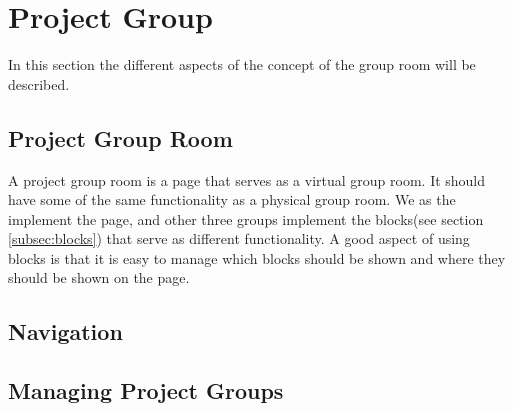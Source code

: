\section{Project Group}
In this section the different aspects of the concept of the group room will be described.
\subsection{Project Group Room}
A project group room is a page that serves as a virtual group room. 
It should have some of the same functionality as a physical group room.
We as the \groupname{} implement the page, and other three groups implement the blocks(see section \ref{subsec:blocks}) that serve as different functionality.
A good aspect of using blocks is that it is easy to manage which blocks should be shown and where they should be shown on the page.




\subsection{Navigation}

\subsection{Managing Project Groups}